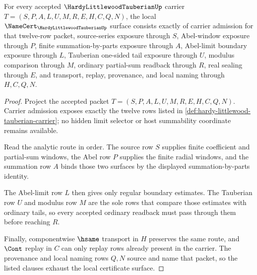 \begin{theorem}
\label{thm:hardy-littlewood-tauberian-namecert-obligations}
For every accepted $\HardyLittlewoodTauberianUp$ carrier $T=(S,P,A,L,U,M,R,E,H,C,Q,N)$, the local $\NameCert_{\HardyLittlewoodTauberianUp}$ surface consists exactly of carrier admission for that twelve-row packet, source-series exposure through $S$, Abel-window exposure through $P$, finite summation-by-parts exposure through $A$, Abel-limit boundary exposure through $L$, Tauberian one-sided tail exposure through $U$, modulus comparison through $M$, ordinary partial-sum readback through $R$, real sealing through $E$, and transport, replay, provenance, and local naming through $H,C,Q,N$.
\end{theorem}
\begin{proof}
Project the accepted packet $T=(S,P,A,L,U,M,R,E,H,C,Q,N)$. Carrier admission exposes exactly the twelve rows listed in \autoref{def:hardy-littlewood-tauberian-carrier}; no hidden limit selector or host summability coordinate remains available.

Read the analytic route in order. The source row $S$ supplies finite coefficient and partial-sum windows, the Abel row $P$ supplies the finite radial windows, and the summation row $A$ binds those two surfaces by the displayed summation-by-parts identity.

The Abel-limit row $L$ then gives only regular boundary estimates. The Tauberian row $U$ and modulus row $M$ are the sole rows that compare those estimates with ordinary tails, so every accepted ordinary readback must pass through them before reaching $R$.

Finally, componentwise $\hsame$ transport in $H$ preserves the same route, and $\Cont$ replay in $C$ can only replay rows already present in the carrier. The provenance and local naming rows $Q,N$ source and name that packet, so the listed clauses exhaust the local certificate surface.
\end{proof}

